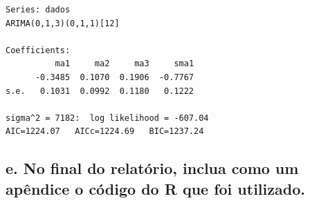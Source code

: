 \documentclass[
  letterpaper,
  DIV=11,
  numbers=noendperiod]{scrartcl}
\begin{document}
\begin{verbatim}
Series: dados 
ARIMA(0,1,3)(0,1,1)[12] 

Coefficients:
          ma1     ma2     ma3     sma1
      -0.3485  0.1070  0.1906  -0.7767
s.e.   0.1031  0.0992  0.1180   0.1222

sigma^2 = 7182:  log likelihood = -607.04
AIC=1224.07   AICc=1224.69   BIC=1237.24
\end{verbatim}

\hypertarget{e.-no-final-do-relatuxf3rio-inclua-como-um-apuxeandice-o-cuxf3digo-do-r-que-foi-utilizado.}{%
\subsection{e. No final do relatório, inclua como um apêndice o código
do R que foi
utilizado.}\label{e.-no-final-do-relatuxf3rio-inclua-como-um-apuxeandice-o-cuxf3digo-do-r-que-foi-utilizado.}}
\end{document}
